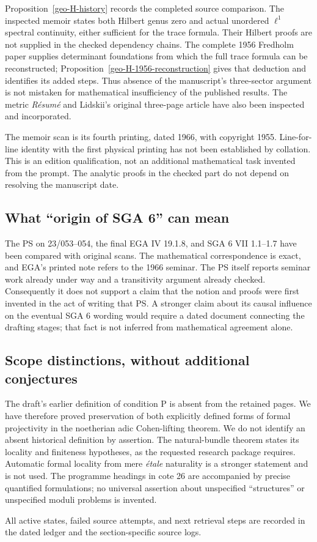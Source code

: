 Proposition~\ref{geo-H-history} records the completed source comparison.
The inspected memoir states both Hilbert genus zero and actual
unordered $\ell^1$ spectral continuity, either sufficient for the
trace formula. Their Hilbert proofs are not supplied in the checked
dependency chains. The complete 1956 Fredholm paper supplies
determinant foundations from which the full trace formula can be
reconstructed; Proposition~\ref{geo-H-1956-reconstruction} gives that
deduction and identifies its added steps. Thus absence of the
manuscript's three-sector argument is not mistaken for mathematical
insufficiency of the published results. The metric \emph{R\'esum\'e}
and Lidskii's original three-page article have also been inspected
and incorporated.

The memoir scan is its fourth printing, dated 1966, with copyright
1955. Line-for-line identity with the first physical printing has
not been established by collation. This is an edition qualification,
not an additional mathematical task invented from the prompt.
The analytic proofs in the checked part do not depend on resolving
the manuscript date.

\subsection{What ``origin of SGA 6'' can mean}

The PS on 23/053--054, the final EGA IV 19.1.8, and SGA 6 VII
1.1--1.7 have been compared with original scans. The mathematical
correspondence is exact, and EGA's printed note refers to the 1966
seminar. The PS itself reports seminar work already under way and a
transitivity argument already checked. Consequently it does not
support a claim that the notion and proofs were first invented in
the act of writing that PS. A stronger claim about its causal
influence on the eventual SGA 6 wording would require a dated
document connecting the drafting stages; that fact is not inferred
from mathematical agreement alone.

\subsection{Scope distinctions, without additional conjectures}

The draft's earlier definition of condition P is absent from the retained
pages. We have therefore proved preservation of both explicitly defined
forms of formal projectivity in the noetherian adic Cohen-lifting theorem.
We do not identify an absent historical definition by assertion.
The natural-bundle theorem states its locality and finiteness hypotheses,
as the requested research package requires. Automatic formal locality
from mere \emph{\'etale} naturality is a stronger statement and is not
used. The programme headings in cote 26 are accompanied by precise
quantified formulations; no universal assertion about unspecified
``structures'' or unspecified moduli problems is invented.

All active states, failed source attempts, and next retrieval steps are
recorded in the dated ledger and the section-specific source logs.
